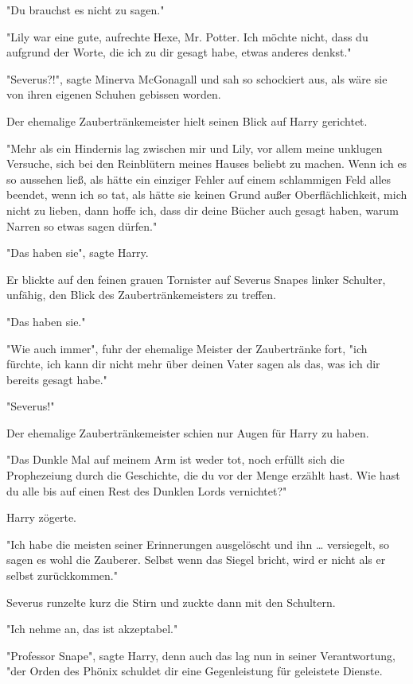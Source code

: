 {"Du brauchst es nicht zu sagen."

"Lily war eine gute, aufrechte Hexe, Mr. Potter. Ich möchte nicht, dass du aufgrund der Worte, die ich zu dir gesagt habe, etwas anderes denkst."

"Severus?!", sagte Minerva McGonagall und sah so schockiert aus, als wäre sie von ihren eigenen Schuhen gebissen worden.

Der ehemalige Zaubertränkemeister hielt seinen Blick auf Harry gerichtet.

"Mehr als ein Hindernis lag zwischen mir und Lily, vor allem meine unklugen Versuche, sich bei den Reinblütern meines Hauses beliebt zu machen. Wenn ich es so aussehen ließ, als hätte ein einziger Fehler auf einem schlammigen Feld alles beendet, wenn ich so tat, als hätte sie keinen Grund außer Oberflächlichkeit, mich nicht zu lieben, dann hoffe ich, dass dir deine Bücher auch gesagt haben, warum Narren so etwas sagen dürfen."

"Das haben sie", sagte Harry.

Er blickte auf den feinen grauen Tornister auf Severus Snapes linker Schulter, unfähig, den Blick des Zaubertränkemeisters zu treffen.

"Das haben sie."

"Wie auch immer", fuhr der ehemalige Meister der Zaubertränke fort, "ich fürchte, ich kann dir nicht mehr über deinen Vater sagen als das, was ich dir bereits gesagt habe."

"Severus!"

Der ehemalige Zaubertränkemeister schien nur Augen für Harry zu haben.

"Das Dunkle Mal auf meinem Arm ist weder tot, noch erfüllt sich die Prophezeiung durch die Geschichte, die du vor der Menge erzählt hast. Wie hast du alle bis auf einen Rest des Dunklen Lords vernichtet?"

Harry zögerte.

"Ich habe die meisten seiner Erinnerungen ausgelöscht und ihn … versiegelt, so sagen es wohl die Zauberer. Selbst wenn das Siegel bricht, wird er nicht als er selbst zurückkommen."

Severus runzelte kurz die Stirn und zuckte dann mit den Schultern.

"Ich nehme an, das ist akzeptabel."

"Professor Snape", sagte Harry, denn auch das lag nun in seiner Verantwortung, "der Orden des Phönix schuldet dir eine Gegenleistung für geleistete Dienste.

}
